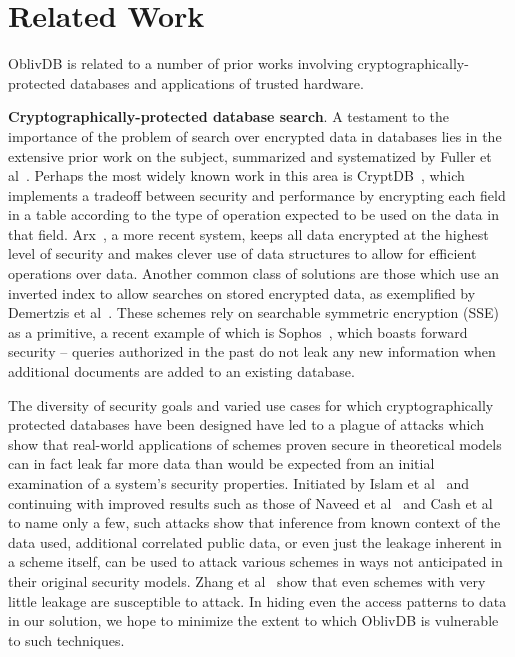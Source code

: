 \documentclass[letterpaper,twocolumn,10pt]{article}
\def\name/{OblivDB}
\begin{document}
\section{Related Work}\label{related}

\name/ is related to a number of prior works involving cryptographically-protected databases and applications of trusted hardware.

  \noindent \textbf{Cryptographically-protected database search}. 
A testament to the importance of the problem of search over encrypted data in databases lies in the extensive prior work on the subject, summarized and systematized by Fuller et al~\cite{FVY+17}. Perhaps the most widely known work in this area is CryptDB~\cite{PRZB12}, which implements a tradeoff between security and performance by encrypting each field in a table according to the type of operation expected to be used on the data in that field. Arx~\cite{PBP16}, a more recent system, keeps all data encrypted at the highest level of security and makes clever use of data structures to allow for efficient operations over data. Another common class of solutions are those which use an inverted index to allow searches on stored encrypted data, as exemplified by Demertzis et al~\cite{DPP+16}. These schemes rely on searchable symmetric encryption (SSE) as a primitive, a recent example of which is Sophos~\cite{Bost16}, which boasts forward security -- queries authorized in the past do not leak any new information when additional documents are added to an existing database. 

The diversity of security goals and varied use cases for which cryptographically protected databases have been designed have led to a plague of attacks which show that real-world applications of schemes proven secure in theoretical models can in fact leak far more data than would be expected from an initial examination of a system's security properties. Initiated by Islam et al~\cite{IKK12} and continuing with improved results such as those of Naveed et al~\cite{NKW15} and Cash et al~\cite{CGPR15} to name only a few, such attacks show that inference from known context of the data used, additional correlated public data, or even just the leakage inherent in a scheme itself, can be used to attack various schemes in ways not anticipated in their original security models. Zhang et al~\cite{ZKP16} show that even schemes with very little leakage are susceptible to attack. In hiding even the access patterns to data in our solution, we hope to minimize the extent to which \name/ is vulnerable to such techniques.   
\end{document}
